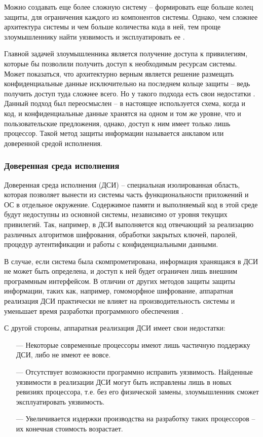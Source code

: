 Можно создавать еще более сложную систему -- формировать еще больше колец защиты, для ограничения каждого из компонентов системы. Однако, чем сложнее архитектура системы и чем больше количества кода в ней, тем проще злоумышленнику найти уязвимость и эксплуатировать ее \cite{complex-systems}.

Главной задачей злоумышленника является получение доступа к привилегиям, которые бы позволили получить доступ к необходимым ресурсам системы. Может показаться, что архитектурно верным является решение размещать конфиденциальные данные исключительно на последнем кольце защиты -- ведь получить доступ туда сложнее всего. Но у такого подхода есть свои недостатки \cite{complex-systems}. Данный подход был переосмыслен -- в настоящее используется схема, когда и код, и конфиденциальные данные хранятся на одном и том же уровне, что и пользовательские предложения, однако, доступ к ним имеет только лишь процессор. Такой метод защиты информации называется анклавом или доверенной средой исполнения.

\subsubsection{Доверенная среда исполнения}

Доверенная среда исполнения (ДСИ) -- специальная изолированная область,  которая позволяет вынести из системы часть функциональности приложений и ОС в отдельное окружение. Содержимое памяти и выполняемый код в этой среде будут недоступны из основной системы, независимо от уровня текущих привилегий. Так, например, в ДСИ выполняется код отвечающий за реализацию различных алгоритмов шифрования, обработки закрытых ключей, паролей, процедур аутентификации и работы с конфиденциальными данными. 

В случае, если система была скомпрометирована, информация хранящаяся в ДСИ не может быть определена, и доступ к ней будет ограничен лишь внешним программным интерфейсом. В отличии от других методов защиты защиты информации, таких как, например, гомоморфное шифрование, аппаратная реализация ДСИ практически не влияет на производительность системы и уменьшает время разработки программного обеспечения \cite{tee}.

С другой стороны, аппаратная реализация ДСИ имеет свои недостатки:

\begin{itemize}
	\item [---] Некоторые современные процессоры имеют лишь частичную поддержку ДСИ, либо не имеют ее вовсе.
	\item [---] Отсутствует возможности программно исправить уязвимость. Найденные уязвимости в реализации ДСИ могут быть исправлены лишь в новых ревизиях процессора, т.е. без его физической замены, злоумышленник сможет эксплуатировать уязвимость.
	\item [---] Увеличивается издержки производства на разработку таких процессоров -- их конечная стоимость возрастает.
\end{itemize}

